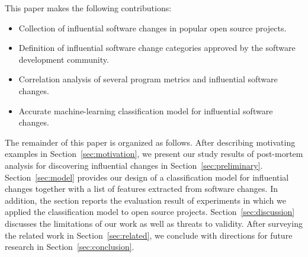 This paper makes the following contributions:

\begin{itemize}
\itemsep0em 
	\item Collection of influential software changes in popular open source projects.
	\item Definition of influential software change categories approved by the software development community.
	\item Correlation analysis of several program metrics and influential software
changes.
	\item Accurate machine-learning classification model for influential software changes.
\end{itemize}

The remainder of this paper is organized as follows. After describing motivating
examples in Section~\ref{sec:motivation}, we present our study results of
post-mortem analysis for discovering influential changes in
Section~\ref{sec:preliminary}.
Section~\ref{sec:model} provides our design of a classification model for
influential changes together with a list of features extracted from software changes.
In addition, the section reports the evaluation result of experiments in which
we applied the classification model to open source projects.
Section~\ref{sec:discussion} discusses the limitations of our work as well as threats to validity.
After surveying the related work in Section~\ref{sec:related}, 
we conclude with directions for future research in
Section~\ref{sec:conclusion}.

